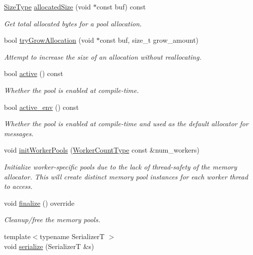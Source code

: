 \begin{DoxyCompactItemize}
\hyperlink{structvt_1_1pool_1_1_pool_a4030898e09d0160c24743a7b949c0d46}{Size\+Type} \hyperlink{structvt_1_1pool_1_1_pool_aa973879eb9a13583ba3ec5da29c77a20}{allocated\+Size} (void $\ast$const buf) const
\begin{DoxyCompactList}\small\item\em Get total allocated bytes for a pool allocation. \end{DoxyCompactList}\item 
bool \hyperlink{structvt_1_1pool_1_1_pool_a62e1e77caac8e11f24be61acd6f4474b}{try\+Grow\+Allocation} (void $\ast$const buf, size\+\_\+t grow\+\_\+amount)
\begin{DoxyCompactList}\small\item\em Attempt to increase the size of an allocation without reallocating. \end{DoxyCompactList}\item 
bool \hyperlink{structvt_1_1pool_1_1_pool_a3f34112821d767815d5049dc83503033}{active} () const
\begin{DoxyCompactList}\small\item\em Whether the pool is enabled at compile-\/time. \end{DoxyCompactList}\item 
bool \hyperlink{structvt_1_1pool_1_1_pool_aa11bdd76d9f6491ac412d5abc5c63274}{active\+\_\+env} () const
\begin{DoxyCompactList}\small\item\em Whether the pool is enabled at compile-\/time and used as the default allocator for messages. \end{DoxyCompactList}\item 
void \hyperlink{structvt_1_1pool_1_1_pool_aeb8ad6a3ac3cf168dc4f2d2be2714edc}{init\+Worker\+Pools} (\hyperlink{namespacevt_aa93398ea48f2cb6c188512250f7cc248}{Worker\+Count\+Type} const \&num\+\_\+workers)
\begin{DoxyCompactList}\small\item\em Initialize worker-\/specific pools due to the lack of thread-\/safety of the memory allocator. This will create distinct memory pool instances for each worker thread to access. \end{DoxyCompactList}\item 
void \hyperlink{structvt_1_1pool_1_1_pool_a45a2880809625a77bb93c3dfcd9c7603}{finalize} () override
\begin{DoxyCompactList}\small\item\em Cleanup/free the memory pools. \end{DoxyCompactList}\item 
{\footnotesize template$<$typename SerializerT $>$ }\\void \hyperlink{structvt_1_1pool_1_1_pool_a7a81f11ae46f0c953c600b223bc09c70}{serialize} (SerializerT \&s)
\end{DoxyCompactItemize}

